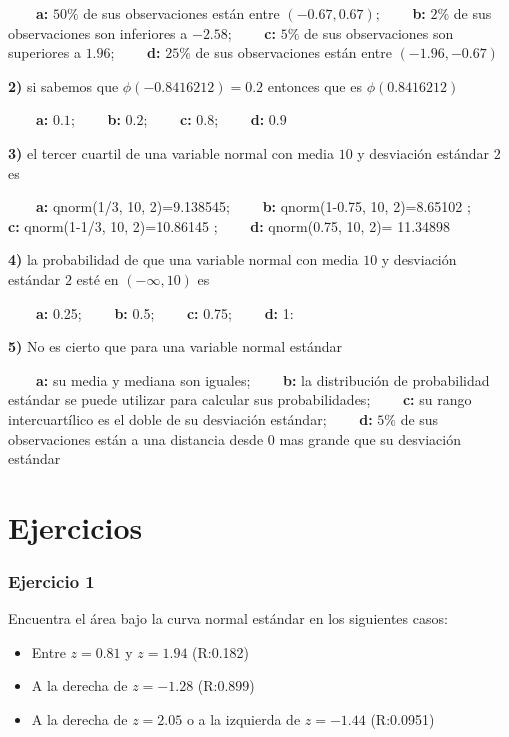 \documentclass[
]{book}
\providecommand{\tightlist}{%
  \setlength{\itemsep}{0pt}\setlength{\parskip}{0pt}}
\begin{document}
\textbf{\(\qquad\)a:} \(50\%\) de sus observaciones están entre \((-0.67,0.67)\);
\textbf{\(\qquad\)b:} \(2\%\) de sus observaciones son inferiores a \(-2.58\);
\textbf{\(\qquad\)c:} \(5\%\) de sus observaciones son superiores a \(1.96\);
\textbf{\(\qquad\)d:} \(25\%\) de sus observaciones están entre \((-1.96,-0.67)\)

\textbf{2)} si sabemos que \(\phi(-0.8416212)=0.2\) entonces que es \(\phi(0.8416212)\)

\textbf{\(\qquad\)a:} \(0.1\);
\textbf{\(\qquad\)b:} \(0.2\);
\textbf{\(\qquad\)c:} \(0.8\);
\textbf{\(\qquad\)d:} \(0.9\)

\textbf{3)} el tercer cuartil de una variable normal con media \(10\) y desviación estándar \(2\) es

\textbf{\(\qquad\)a:} qnorm(1/3, 10, 2)=9.138545;
\textbf{\(\qquad\)b:} qnorm(1-0.75, 10, 2)=8.65102 ;
\textbf{\(\qquad\)c:} qnorm(1-1/3, 10, 2)=10.86145 ;
\textbf{\(\qquad\)d:} qnorm(0.75, 10, 2)= 11.34898

\textbf{4)} la probabilidad de que una variable normal con media \(10\) y desviación estándar \(2\) esté en \((-\infty,10)\) es

\textbf{\(\qquad\)a:} 0.25;
\textbf{\(\qquad\)b:} 0.5;
\textbf{\(\qquad\)c:} 0.75;
\textbf{\(\qquad\)d:} 1:

\textbf{5)} No es cierto que para una variable normal estándar

\textbf{\(\qquad\)a:} su media y mediana son iguales; \textbf{\(\qquad\)b:} la distribución de probabilidad estándar se puede utilizar para calcular sus probabilidades; \textbf{\(\qquad\)c:} su rango intercuartílico es el doble de su desviación estándar; \textbf{\(\qquad\)d:} \(5\%\) de sus observaciones están a una distancia desde \(0\) mas grande que su desviación estándar

\hypertarget{ejercicios-7}{%
\section{Ejercicios}\label{ejercicios-7}}

\hypertarget{ejercicio-1-6}{%
\subsubsection{Ejercicio 1}\label{ejercicio-1-6}}

Encuentra el área bajo la curva normal estándar en los siguientes casos:

\begin{itemize}
\tightlist
\item
  Entre \(z=0.81\) y \(z=1.94\) (R:0.182)
\item
  A la derecha de \(z=-1.28\) (R:0.899)
\item
  A la derecha de \(z=2.05\) o a la izquierda de \(z=-1.44\) (R:0.0951)
\end{itemize}
\end{document}
